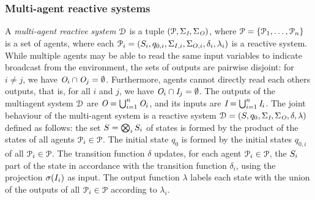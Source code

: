 \iffalse
\subsubsection{Serial composition of reactive systems}
Consider two reactive systems  $\proc = (\states,q_{0},\ialphabet,\oalphabet,\delta,\lambda)$ and $\shield = (\states', q_{0}',\ialphabet\times\oalphabet, \oalphabet,\delta',\lambda')$.
The \emph{serial composition} of $\proc$ and $\shield$ is obtained by feeding the input and output of $\proc$ to $\shield$ and results in a new reactive system $\proc \comp \shield=(\hat{\states}, \hat{q_{0}}, \ialphabet,\oalphabet, \hat{\delta},
\hat{\lambda})$, where
   $\hat{\states} = \states \times \states'$,
   $\hat{q_{0}} = (q_{0}, q_{0}')$,
   $\hat{\delta}((q,q'),\isymb) = (\delta(q,\isymb), \delta'(q',(\isymb,\lambda(q,\isymb))))$, and
   $\hat{\lambda}((q,q'),\isymb) = \lambda'(q',(\isymb,\lambda(q, \isymb)))$.
\fi
   
\subsubsection{Multi-agent reactive systems}
A \emph{multi-agent reactive system} $\mathcal{D}$ is a tuple $(\mathcal{P}, \Sigma_{\textit{I}},  \Sigma_{\textit{O}})$, where $\mathcal{P} = \{\mathcal{P}_1,\ldots,\mathcal{P}_n\}$ is a set of agents, where each $\mathcal{P}_i = (S_i, q_{0,i},\Sigma_{I,i},\Sigma_{O,i},\delta_i,\lambda_i)$ is a reactive system.
%
While multiple agents may be able to read the same input variables to indicate
broadcast from the environment, the sets of outputs are pairwise disjoint: for $i \neq j$, we have $\textit{O}_i \cap \textit{O}_j = \emptyset$. Furthermore, agents cannot directly read each others outputs, that is, for all $i$ and $j$, we have $\textit{O}_i \cap \textit{I}_j = \emptyset$. The outputs of the multiagent system  $\mathcal{D}$ are $\textit{O} = \bigcup_{i=1}^n \textit{O}_i$, and its inputs are $\textit{I}  = \bigcup_{i=1}^n \textit{I}_i$.
%
The joint behaviour of the multi-agent system is a reactive system 
$\mathcal{D}=(S, q_{0}, \Sigma_{\textit{I}},\Sigma_{\textit{O}}, \delta,
\lambda)$ defined as follows: the set $S = \bigotimes_i S_i$ of states is formed by the product of
the states of all agents $\mathcal{P}_i \in \mathcal{P}$. The initial state $q_{0}$ is formed
by the initial states $q_{0,i}$ of all $\mathcal{P}_i \in \mathcal{P}$. The transition function $\delta$ updates, for each agent $\mathcal{P}_i \in \mathcal{P}$, the $S_i$ part of the state in accordance with the transition function $\delta_i$, using
the projection $\sigma(I_i)$ as input. The output function $\lambda$ labels each state with the
union of the outputs of all $\mathcal{P}_i \in \mathcal{P}$ according to $\lambda_i$.




